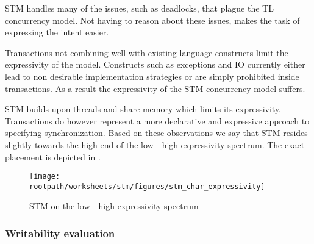 \ac{STM} handles many of the issues, such as deadlocks, that plague the \ac{TL} concurrency model. Not having to reason about these issues, makes the task of expressing the intent easier. 

Transactions not combining well with existing language constructs limit the expressivity of the model. Constructs such as exceptions and \ac{IO} currently either lead to non desirable implementation strategies or are simply prohibited inside transactions. As a result the expressivity of the \ac{STM} concurrency model suffers.

\ac{STM} builds upon threads and share memory which limits its expressivity. Transactions do however represent a more declarative and expressive approach to specifying synchronization. Based on these observations we say that \ac{STM} resides slightly towards the high end of the low - high expressivity spectrum. The exact placement is depicted in .

\begin{figure}[htbp]
\centering
 \texttt{[image: \\rootpath/worksheets/stm/figures/stm\_char\_expressivity]} 
 \caption{\ac{STM} on the low - high expressivity spectrum}
\label{fig:char_stm_expressivity}
\end{figure}


\subsubsection{Writability evaluation}

\worksheetend
